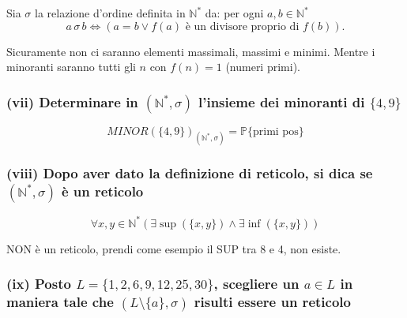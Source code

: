 Sia $\sigma$ la relazione d'ordine definita in $\mathbb{N}^*$ da: per ogni $a, b \in \mathbb{N}^*$
$$a \,\sigma\, b \Longleftrightarrow (a = b \lor f(a) \text{ è un divisore proprio di } f(b)).$$

Sicuramente non ci saranno elementi massimali, massimi e minimi. Mentre i minoranti saranno tutti gli $n$ con $f(n) = 1$ (numeri primi).

\subsubsection*{(vii) Determinare in $(\mathbb{N}^*, \sigma)$ l'insieme dei minoranti di $\{4, 9\}$}




$$MINOR(\{4, 9\})_{(\mathbb{N}^*, \sigma)} = \mathbb{P} \{\text{primi pos}\}$$

\subsubsection*{(viii) Dopo aver dato la definizione di reticolo, si dica se $(\mathbb{N}^*, \sigma)$ è un reticolo}

$$\forall x, y \in \mathbb{N}^* \left( \exists \sup(\{x, y\}) \land \exists \inf(\{x, y\}) \right)$$

NON è un reticolo, prendi come esempio il SUP tra 8 e 4, non esiste.

\subsubsection*{(ix) Posto $L = \{1, 2, 6, 9, 12, 25, 30\}$, scegliere un $a \in L$ in maniera tale che $(L \setminus \{a\}, \sigma)$ risulti essere un reticolo}

